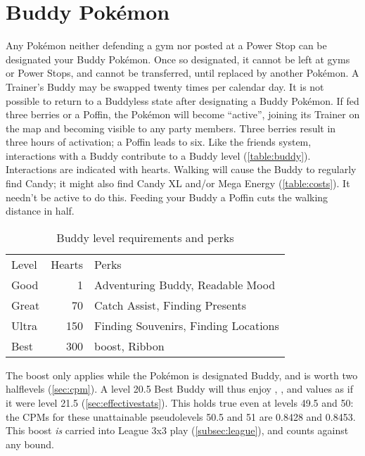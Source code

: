 \section{Buddy Pokémon\label{sec:buddies}}
Any Pokémon neither defending a gym nor posted at a Power Stop can be designated your Buddy Pokémon.
Once so designated, it cannot be left at gyms or Power Stops, and cannot be transferred,
  until replaced by another Pokémon.
A Trainer's Buddy may be swapped twenty times per calendar day.
It is not possible to return to a Buddyless state after designating a Buddy Pokémon.
If fed three berries or a Poffin, the Pokémon will become ``active'',
  joining its Trainer on the map and becoming visible to any party members.
Three berries result in three hours of activation; a Poffin leads to six.
Like the friends system, interactions with a Buddy contribute to a Buddy level (\autoref{table:buddy}).
Interactions are indicated with hearts.
Walking will cause the Buddy to regularly find Candy; it might also find Candy XL
  and/or Mega Energy (\autoref{table:costs}).
It needn't be active to do this.
Feeding your Buddy a Poffin cuts the walking distance in half.
\begin{table}
\centering
\begin{tabular}{lrl}
Level & Hearts & Perks\\
\Midrule
Good & 1 & Adventuring Buddy, Readable Mood\\
Great & 70 & Catch Assist, Finding Presents\\
Ultra & 150 & Finding Souvenirs, Finding Locations\\
Best & 300 & \CPM{} boost, Ribbon\\
\end{tabular}
\caption{Buddy level requirements and perks\label{table:buddy}}
\end{table}
The \CPM{} boost only applies while the Pokémon is designated Buddy,
  and is worth two halflevels (\autoref{sec:cpm}).
A level 20.5 Best Buddy will thus enjoy , , and  values
  as if it were level 21.5 (\autoref{sec:effectivestats}).
This holds true even at levels 49.5 and 50: the CPMs for these unattainable
  pseudolevels 50.5 and 51 are 0.8428 and 0.8453.
This boost \textit{is} carried into League 3x3 play (\autoref{subsec:league}),
  and counts against any \CP{} bound.

